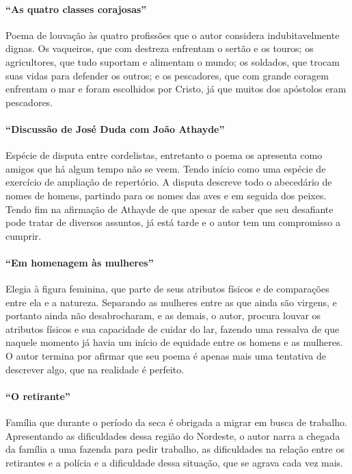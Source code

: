 \paragraph{``As quatro classes corajosas''}

Poema de louvação às quatro profissões que o autor considera
indubitavelmente dignas. Os vaqueiros, que com destreza enfrentam o
sertão e os touros; os agricultores, que tudo suportam e alimentam o
mundo; os soldados, que trocam suas vidas para defender os outros; e os
pescadores, que com grande coragem enfrentam o mar e foram escolhidos
por Cristo, já que muitos dos apóstolos eram pescadores. 

\paragraph{``Discussão de José Duda com João
Athayde''}

Espécie de disputa entre cordelistas, entretanto o poema os apresenta
como amigos que há algum tempo não se veem. Tendo início como uma
espécie de exercício de ampliação de repertório. A disputa descreve
todo o abecedário de nomes de homens, partindo para os nomes das aves e
em seguida dos peixes. Tendo fim na afirmação de Athayde de que apesar
de saber que seu desafiante pode tratar de diversos assuntos, já está
tarde e o autor tem um compromisso a cumprir.

\paragraph{``Em homenagem às mulheres''}

Elegia à figura feminina, que parte de seus atributos físicos e de
comparações entre ela e a natureza. Separando as mulheres entre as que
ainda são virgens, e portanto ainda não desabrocharam, e as demais, o
autor, procura louvar os atributos físicos e sua capacidade de cuidar
do lar, fazendo uma ressalva de que naquele momento já havia um início
de equidade entre os homens e as mulheres. O autor termina por afirmar
que seu poema é apenas mais uma tentativa de descrever algo, que na
realidade é perfeito. 

\paragraph{``O retirante''}

Família que durante o período da seca é obrigada a migrar em busca de
trabalho. Apresentando as dificuldades dessa região do Nordeste, o
autor narra a chegada da família a uma fazenda para pedir trabalho, as
dificuldades na relação entre os retirantes e a polícia e a
dificuldade dessa situação, que se agrava cada vez mais. 

